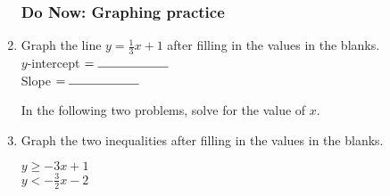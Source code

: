 \documentclass[12pt, oneside]{article}
\begin{document}
  \begin{enumerate}
    \subsubsection*{Do Now: Graphing practice}

        \item Graph the line $y=\frac{1}{3} x +1$ after filling in the values in the blanks.\\[0.85cm]
              $y$-intercept $= \rule{2cm}{0.15mm}$ \\[0.5cm]
              Slope $= \rule{2cm}{0.15mm}$\\

        \begin{center} %
        \end{center}

        In the following two problems, solve for the value of $x$.

\newpage
\item Graph the two inequalities after filling in the values in the blanks.\\[0.5cm]

  \begin{multicols}{2}
    $y \geq -3 x +1$ \\
    $y < -\frac{3}{2} x -2$
  \end{multicols}
  \begin{center} %
  \end{center}


\end{enumerate}
\end{document}
